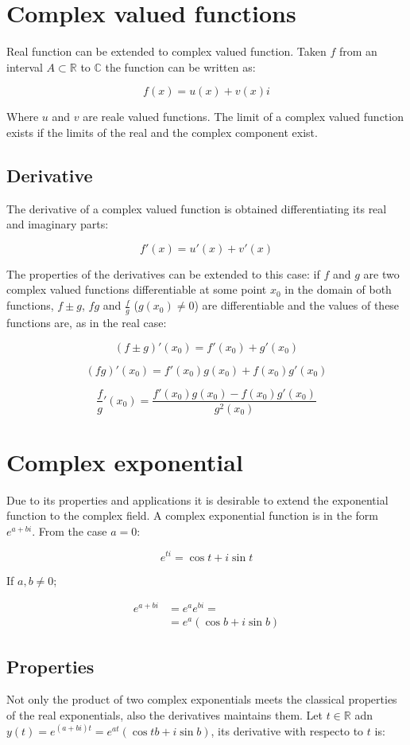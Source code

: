 \section{Complex valued functions}
Real function can be extended to complex valued function.
Taken $f$ from an interval $A\subset\mathbb{R}$ to $\mathbb{C}$ the function can be written as:

$$f(x) = u(x) + v(x)i$$

Where $u$ and $v$ are reale valued functions.
The limit of a complex valued function exists if the limits of the real and the complex component exist.

	\subsection{Derivative}
	The derivative of a complex valued function is obtained differentiating its real and imaginary parts:

	$$f'(x) = u'(x) + v'(x)$$

	The properties of the derivatives can be extended to this case: if $f$ and $g$ are two complex valued functions differentiable at some point $x_0$ in the domain of both functions, $f\pm g$, $fg$ and $\frac{f}{g}$ ($g(x_0)\neq 0$) are differentiable and the values of these functions are, as in the real case:

	$$(f\pm g)'(x_0) = f'(x_0) + g'(x_0)$$

	$$(fg)'(x_0) = f'(x_0)g(x_0) + f(x_0)g'(x_0)$$

	$$\frac{f}{g}'(x_0) = \frac{f'(x_0)g(x_0)-f(x_0)g'(x_0)}{g^2(x_0)}$$

\section{Complex exponential}
Due to its properties and applications it is desirable to extend the exponential function to the complex field.
A complex exponential function is in the form $e^{a+bi}$.
From the case $a = 0$:

$$e^{ti} = \cos t + i\sin t$$

If $a, b\neq 0$;

\begin{align*}
	e^{a+bi} &= e^ae^{bi} =\\
					 &=e^a(\cos b + i\sin b)
\end{align*}

	\subsection{Properties}
	Not only the product of two complex exponentials meets the classical properties of the real exponentials, also the derivatives maintains them.
	Let $t\in\mathbb{R}$ adn $y(t) = e^{(a+bi)t} = e^{at}(\cos t b + i\sin b)$, its derivative with respecto to $t$ is:

